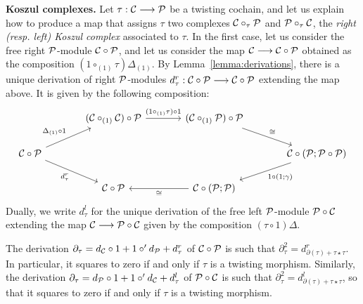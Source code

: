 \textbf{Koszul complexes.}
Let $\tau : \mathcal{C}\longrightarrow {\mathcal{P}}$ be a twisting cochain,
and let us explain how to produce a map that assigns $\tau$
two complexes $\mathcal{C}\circ_\tau {\mathcal{P}}$ and ${\mathcal{P}}\circ_\tau\mathcal{C}$, 
the \emph{right (resp. left) Koszul complex} associated to $\tau$.
In the first case, let us consider the free right ${\mathcal{P}}$-module
$\mathcal{C}\circ {\mathcal{P}}$, and let us consider the map
$\mathcal{C} \longrightarrow \mathcal{C}\circ {\mathcal{P}}$
obtained as the composition $(1\circ_{(1)} \tau)\Delta_{(1)}$.
By Lemma~\ref{lemma:derivations}, there is a unique derivation
of right ${\mathcal{P}}$-modules
$d_\tau^r : \mathcal{C}\circ {\mathcal{P}} \longrightarrow \mathcal{C}\circ {\mathcal{P}}$
extending the map above. It is given by the following composition:
\[
\begin{tikzcd}[column sep = large]
{} & (	\CC\circ_{(1)} \CC )\circ\PP \arrow[r,"(1\circ_{(1)}\tau)\circ 1"] 
	& (	\CC\circ_{(1)} \PP )\circ
	\PP  \arrow[dr,"\cong"]\\ 
\CC\circ \PP \arrow[ur,"\Delta_{(1)}\circ 1"]\arrow[dr,"d_\tau^r",swap] & {} & {} & \CC\circ (\PP;\PP\circ\PP)\arrow[dl,"1\circ(1;\gamma)"]\\ 
{} &  \CC\circ \PP &  \CC\circ (\PP;\PP)\arrow[l,"\cong"] &{}
\end{tikzcd}
 \]
Dually, we write $d_\tau^l$ for the unique derivation of the free left 
${\mathcal{P}}$-module ${\mathcal{P}}\circ\mathcal{C}$ extending the map $\mathcal{C}\longrightarrow {\mathcal{P}}\circ \mathcal{C}$
given by the composition $(\tau\circ 1)\Delta$. 


\begin{proposition}
The derivation $\partial_\tau = d_{\mathcal{C}}\circ 1  + 1\circ' d_{\mathcal{P}} + d_\tau^r$
of $\mathcal{C}\circ {\mathcal{P}}$
is such that $\partial_\tau^2 = d_{\partial(\tau) + \tau\star\tau}^r$. In 
particular, it squares to zero if and only if $\tau$ is a twisting
morphism. Similarly, the derivation  $\partial_\tau = d_{\mathcal{P}}\circ 1  + 1\circ' 
d_{\mathcal{C}} + d_\tau^l$ of ${\mathcal{P}}\circ \mathcal{C}$ is such that 
$\partial_\tau^2 = d_{\partial(\tau) + \tau\star\tau}^l$,
so that it squares to zero if and only if $\tau$ is a twisting
morphism.
\end{proposition}

